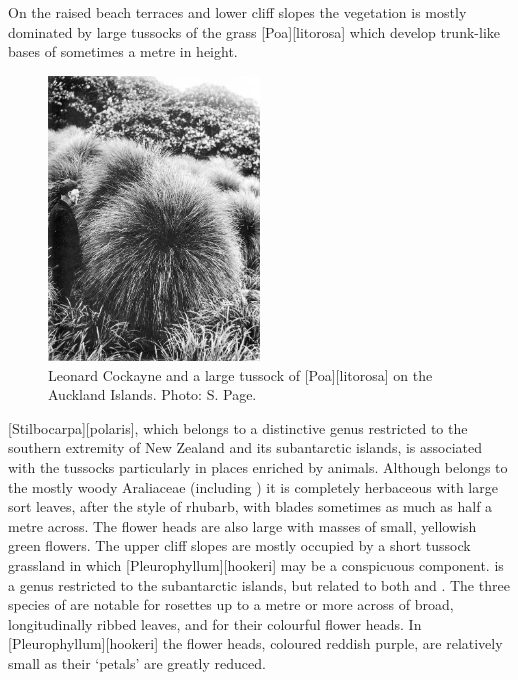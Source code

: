 On the raised beach terraces and lower cliff slopes the vegetation is mostly dominated by large tussocks of the grass [Poa][litorosa] which develop trunk-like bases of sometimes a metre in height.
\begin{figure}
	\includegraphics[width=0.5\textwidth]{graphics/figure115cockayne.jpg}
	\centering
	\caption[Leonard Cockayne and a large tussock]{Leonard Cockayne and a large tussock of [Poa][litorosa] on the Auckland Islands.
	Photo: S. Page.}%
	\label{fig:115cockayne}
\end{figure}
[Stilbocarpa][polaris], which belongs to a distinctive genus restricted to the southern extremity of New Zealand and its subantarctic islands, is associated with the tussocks particularly in places enriched by animals.
Although  belongs to the mostly woody Araliaceae (including ) it is completely herbaceous with large sort leaves, after the style of rhubarb, with blades sometimes as much as half a metre across.
The flower heads are also large with masses of small, yellowish green flowers.
The upper cliff slopes are mostly occupied by a short tussock grassland in which [Pleurophyllum][hookeri] may be a conspicuous component.
 is a genus restricted to the subantarctic islands, but related to both  and .
The three species of  are notable for rosettes up to a metre or more across of broad, longitudinally ribbed leaves, and for their colourful flower heads.
In [Pleurophyllum][hookeri] the flower heads, coloured reddish purple, are relatively small as their `petals' are greatly reduced.

